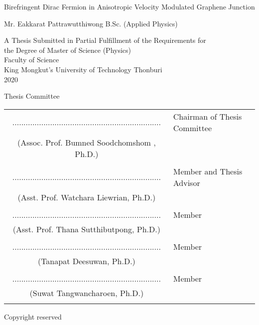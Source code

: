 \begin{center}
    Birefringent Dirac Fermion in Anisotropic Velocity Modulated Graphene Junction
    \\

    \vspace{1.5cm}

    Mr. Eakkarat    Pattrawutthiwong  B.Sc. (Applied Physics) \\

    \vspace{1.5cm}

    A Thesis Submitted in Partial Fulfillment of the Requirements for\\
    the Degree of Master of Science  (Physics) \\
    Faculty of Science \\
    King Mongkut's University of Technology Thonburi \\
    2020 \\
\end{center}

    \vspace{.3cm}\noindent Thesis Committee \vspace{1cm}

\noindent \begin{tabular}{cl}

    ...................................................................&   \hspace{0.3in} Chairman of Thesis Committee \\
    (Assoc. Prof. Bumned Soodchomshom , Ph.D.)  & \\ \\

    ...................................................................&   \hspace{0.3in} Member and Thesis Advisor\\
    (Asst. Prof. Watchara Liewrian, Ph.D.)  & \\ \\

    ...................................................................&   \hspace{0.3in} Member \\
    (Asst. Prof. Thana Sutthibutpong, Ph.D.)  & \\ \\

    ...................................................................&   \hspace{0.3in} Member\\
    (Tanapat Deesuwan, Ph.D.)  & \\ \\

    ...................................................................&   \hspace{0.3in} Member \\
    (Suwat Tangwancharoen, Ph.D.)  & \\ \\

\end{tabular}

\begin{center}
    Copyright reserved
\end{center}
